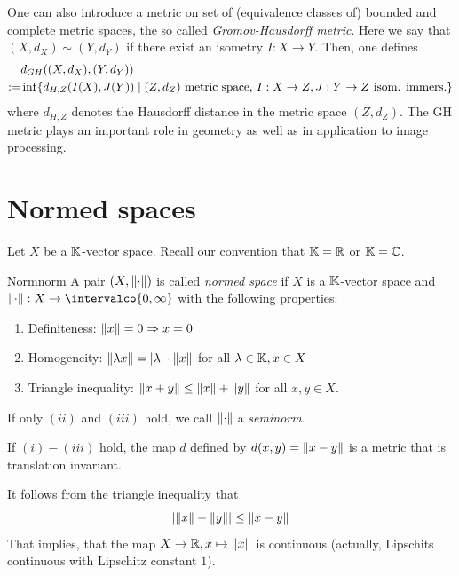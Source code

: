 \documentclass[language=english]{../../Template/TemplateLecture}
\begin{document}
One can also introduce a metric on set of (equivalence classes of) bounded and complete metric spaces, the so called \emph{Gromov-Hausdorff metric}. Here we say that $(X, d_X) \sim (Y, d_Y)$ if there exist an isometry $I : X \to Y$. Then, one defines
\begin{equation}
    \begin{split}
        &d_{GH}((X,d_X),(Y,d_Y)) \\
        :=& \inf\{d_{H,Z}(I(X),J(Y)) \mid \text{$(Z,d_Z)$ metric space, $I: X \to Z, J: Y \to Z$ isom. immers.}\}
    \end{split}
\end{equation}
where $d_{H,Z}$ denotes the Hausdorff distance in the metric space $(Z,d_Z)$. The GH metric plays an important role in geometry as well as in application to image processing.


\section{Normed spaces}
Let $X$ be a $\mathbb{K}$-vector space. Recall our convention that $\mathbb{K} = \mathbb{R}$ or $\mathbb{K} = \mathbb{C}$.

\begin{defi}{Norm}{norm}
    A pair $(X, \lVert\cdot\rVert)$ is called \emph{normed space} if $X$ is a $\mathbb{K}$-vector space and $\norm{\cdot}: X \to \intervalco{0,\infty}$ with the following properties:
    \begin{enumerate}[$(i)$]
        \item Definiteness: $\lVert x\rVert = 0 \Rightarrow x = 0$ 
        \item Homogeneity: $\lVert\lambda x\rVert = \lvert\lambda\rvert \cdot \lVert x\rVert$ for all $\lambda \in \mathbb{K}, x \in X$ 
        \item Triangle inequality: $\lVert x + y\rVert \leq \lVert x\rVert + \lVert y\rVert$ for all $x, y \in X$. 
    \end{enumerate}
\end{defi}
If only $(ii)$ and $(iii)$ hold, we call $\lVert\cdot\rVert$ a \emph{seminorm}.

If $(i)-(iii)$ hold, the map $d$ defined by $d(x,y) = \lVert x-y\rVert$ is a metric that is translation invariant.

It follows from the triangle inequality that 
\begin{equation}
    \lvert\lVert x\rVert - \lVert y\rVert\rvert \leq \lVert x - y\rVert
\end{equation}
That implies, that the map $X \to \mathbb{R}, x \mapsto \lVert x\rVert$ is continuous (actually, Lipschits continuous with Lipschitz constant $1$).
\end{document}
